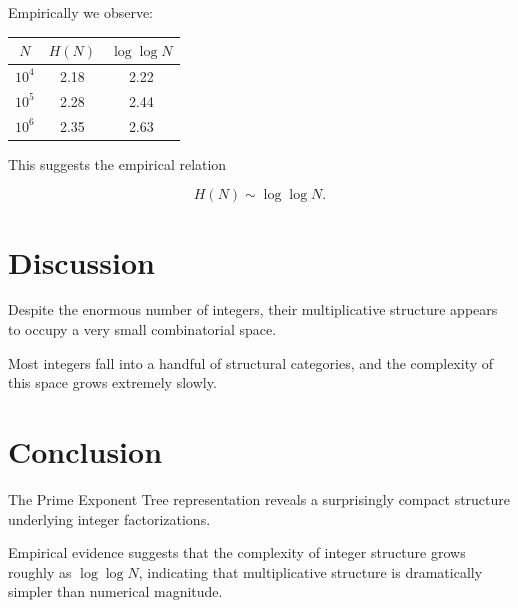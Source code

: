 \documentclass[11pt]{article}
\begin{document}
Empirically we observe:

\begin{center}
\begin{tabular}{ccc}
\toprule
$N$ & $H(N)$ & $\log\log N$ \\
\midrule
$10^4$ & 2.18 & 2.22 \\
$10^5$ & 2.28 & 2.44 \\
$10^6$ & 2.35 & 2.63 \\
\bottomrule
\end{tabular}
\end{center}

This suggests the empirical relation

\begin{equation}
H(N) \sim \log\log N.
\end{equation}

\section{Discussion}

Despite the enormous number of integers, their multiplicative
structure appears to occupy a very small combinatorial space.

Most integers fall into a handful of structural categories,
and the complexity of this space grows extremely slowly.

\section{Conclusion}

The Prime Exponent Tree representation reveals a surprisingly
compact structure underlying integer factorizations.

Empirical evidence suggests that the complexity of integer
structure grows roughly as $\log\log N$, indicating that
multiplicative structure is dramatically simpler than
numerical magnitude.
\end{document}
